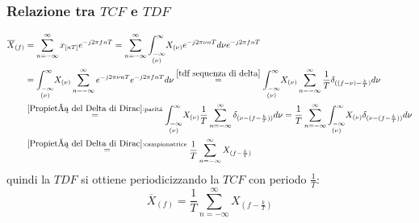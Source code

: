     \subsubsection{Relazione tra $TCF$ e $TDF$}\label{Relazione tra $TCF$ e $TDF$}
        \begin{align}
            \overline{X}_{(f)} &= \sum_{n=-\infty}^{\infty} x_{[nT]}e^{-j2\pi fnT} = \sum_{n=-\infty}^{\infty} \underset{(\nu)}{\int_{-\infty}^{\infty}} X_{(\nu)} e^{-j2\pi \nu nT} d\nu e^{-j2\pi fnT} \nonumber \\
                               &= \underset{(\nu)}{\int_{-\infty}^{\infty}} X_{(\nu)} \sum_{n=-\infty}^{\infty} e^{-j2\pi \nu nT} e^{-j2\pi fnT} d\nu \overset{\ref{tdf sequenza di delta}}{=} \underset{(\nu)}{\int_{-\infty}^{\infty}} X_{(\nu)} \sum_{n=-\infty}^{\infty} \frac{1}{T} \delta_{((f-\nu)-\frac{k}{T})} d\nu  \nonumber \\
                               &\overset{\ref{Propietá del Delta di Dirac}:\text{paritá}}{=} \underset{(\nu)}{\int_{-\infty}^{\infty}} X_{(\nu)} \frac{1}{T} \sum_{n=-\infty}^{\infty}  \delta_{(\nu-(f-\frac{k}{T}))} d\nu = \frac{1}{T} \sum_{n=-\infty}^{\infty} \underset{(\nu)}{\int_{-\infty}^{\infty}} X_{(\nu)} \delta_{(\nu-(f-\frac{k}{T}))} d\nu  \nonumber \\
                               &\overset{\ref{Propietá del Delta di Dirac}:\text{campionatrice}}{=}  \frac{1}{T} \sum_{n=-\infty}^{\infty} X_{(f-\frac{k}{T})} \nonumber
        \end{align}
        quindi la $TDF$ si ottiene periodicizzando la $TCF$ con periodo $\frac{1}{T}$:
        \[
            \overline{X}_{(f)} = \frac{1}{T} \sum_{n=-\infty}^{\infty} X_{(f-\frac{k}{T})} 
        \] 
